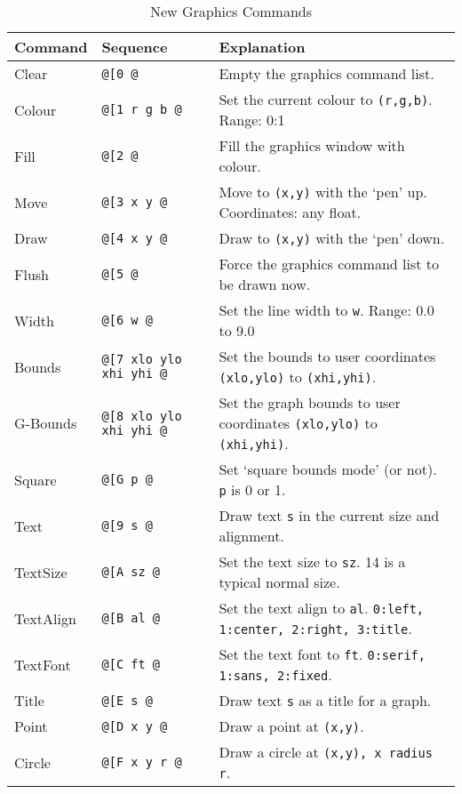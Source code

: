 \documentclass[a4paper,twoside,11pt]{article}
\begin{document}
\begin{table}
\centering
\begin{tabular}{|| l | l | l ||}
\hline
Command & Sequence & Explanation\\
\hline
Clear  & \texttt{@[0 @}             & \footnotesize{Empty the graphics command list.}\\
Colour & \texttt{@[1 r g b @} & \footnotesize{Set the current colour to \texttt{(r,g,b)}. Range: 0:1}\\
Fill   & \texttt{@[2 @}             & \footnotesize{Fill the graphics window with colour.}\\
Move   & \texttt{@[3 x y @}   & \footnotesize{Move to \texttt{(x,y)} with the `pen' up. Coordinates: any float.}\\
Draw   & \texttt{@[4 x y @}   & \footnotesize{Draw to \texttt{(x,y)} with the `pen' down.}\\
Flush  & \texttt{@[5 @}             & \footnotesize{Force the graphics command list to be drawn now.}\\
Width  & \texttt{@[6 w @}         & \footnotesize{Set the line width to \texttt{w}. Range: 0.0 to 9.0}\\
\hline
Bounds   & \texttt{@[7 xlo ylo xhi yhi @}   & \footnotesize{Set the bounds to user coordinates \texttt{(xlo,ylo)} to \texttt{(xhi,yhi)}.}\\
G-Bounds   & \texttt{@[8 xlo ylo xhi yhi @}   & \footnotesize{Set the graph bounds to user coordinates \texttt{(xlo,ylo)} to \texttt{(xhi,yhi)}.}\\
Square & \texttt{@[G p @}         & \footnotesize{Set `square bounds mode' (or not). \texttt{p} is 0 or 1.}\\
Text & \texttt{@[9 s @}         & \footnotesize{Draw text \texttt{s} in the current size and alignment.}\\
TextSize & \texttt{@[A sz @}         & \footnotesize{Set the text size to \texttt{sz}. 14 is a typical normal size.}\\
TextAlign & \texttt{@[B al @}         & \footnotesize{Set the text align to \texttt{al}. \texttt{0:left, 1:center, 2:right, 3:title}.}\\
TextFont & \texttt{@[C ft @}         & \footnotesize{Set the text font to \texttt{ft}. \texttt{0:serif, 1:sans, 2:fixed}.}\\
Title & \texttt{@[E s @}         & \footnotesize{Draw text \texttt{s} as a title for a graph.}\\
Point & \texttt{@[D x y @}         & \footnotesize{Draw a point at \texttt{(x,y)}.}\\
Circle & \texttt{@[F x y r @}         & \footnotesize{Draw a circle at \texttt{(x,y), x radius \texttt{r}}.}\\
\hline
\end{tabular}
\caption{New Graphics Commands}
\label{tab:graphicscmds2}
\end{table}
\end{document}
